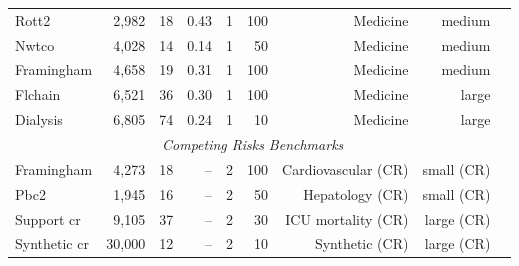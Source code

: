 \begin{longtable}{lrrrrrrrl}
Rott2 & 2,982 & 18 & 0.43 & 1 & 100 & Medicine & medium \\
Nwtco & 4,028 & 14 & 0.14 & 1 & 50 & Medicine & medium \\
Framingham & 4,658 & 19 & 0.31 & 1 & 100 & Medicine & medium \\
Flchain & 6,521 & 36 & 0.30 & 1 & 100 & Medicine & large \\
Dialysis & 6,805 & 74 & 0.24 & 1 & 10 & Medicine & large \\
\midrule
\multicolumn{8}{c}{\textit{Competing Risks Benchmarks}} \\
\midrule
Framingham & 4,273 & 18 & -- & 2 & 100 & Cardiovascular (CR) & small (CR) \\
Pbc2 & 1,945 & 16 & -- & 2 & 50 & Hepatology (CR) & small (CR) \\
Support cr & 9,105 & 37 & -- & 2 & 30 & ICU mortality (CR) & large (CR) \\
Synthetic cr & 30,000 & 12 & -- & 2 & 10 & Synthetic (CR) & large (CR) \\
\end{longtable}